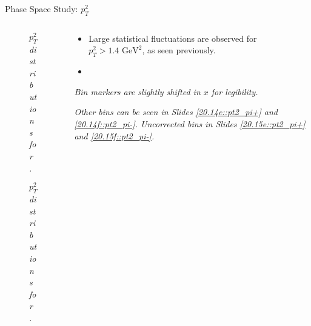 \begin{frame}{Phase Space Study: $p_T^2$}
    \label{12.15::pt2}

    \begin{columns}[onlytextwidth,T]

    \begin{column}{.44\linewidth}
        \vspace{-15pt}
        \begin{center}
            \begin{figure}[t]
                \scriptsize{\textit{$p_T^2$ distributions for \ef{$\pi^-$}.}}
            \end{figure}

            \vspace{-9pt}
            \begin{figure}[t]
                \scriptsize{\textit{$p_T^2$ distributions for \ef{$\pi^+$}.}}
            \end{figure}
        \end{center}
    \end{column}

    \begin{column}{.54\linewidth}
        \begin{itemize}
            \item
                Large statistical fluctuations are observed for $p_T^2 > 1.4 \text{ GeV}^2$, as seen previously.

            \vspace{12pt}
            \item
        \end{itemize}

        \vspace{105pt}

        \begin{flushright}
            \tiny{\textit{Bin markers are slightly shifted in $x$ for legibility.}}

            \vspace{-0.5pt}

            \tiny{\textit{
                Other bins can be seen in Slides \textcolor{efd_purple}{\ref{20.14e::pt2_pi+}} and \textcolor{efd_purple}{\ref{20.14f::pt2_pi-}}.
                Uncorrected bins in Slides \textcolor{efd_purple}{\ref{20.15e::pt2_pi+}} and \textcolor{efd_purple}{\ref{20.15f::pt2_pi-}}.
            }}
        \end{flushright}
    \end{column}

    \end{columns}
\end{frame}

